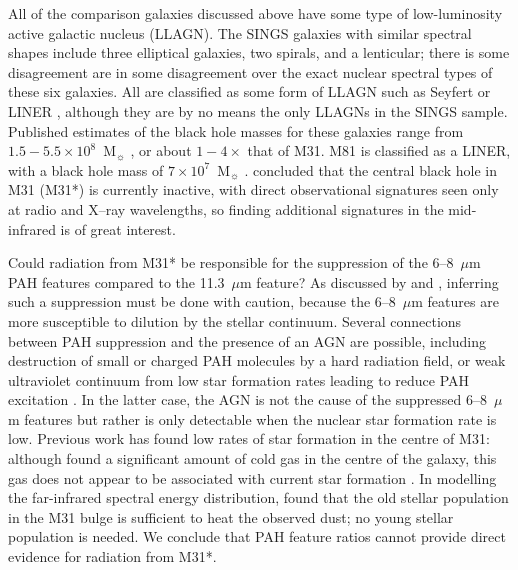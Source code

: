 All of the comparison galaxies discussed above have some type of low-luminosity active galactic nucleus (LLAGN).
The SINGS galaxies with similar spectral shapes include  three elliptical galaxies, two spirals, and a lenticular;
there is some disagreement  \citep{kennicutt03,Smith:2007lr, moustakas2010} are in some disagreement over the
exact nuclear spectral types of these six galaxies.  All are classified as some form of LLAGN
such as Seyfert or LINER \citep[luminous AGNs were intentionally omitted from the SINGS sample;][]{kennicutt03}, although they are
by no means the only LLAGNs in the SINGS sample.
Published estimates of the black hole masses for these galaxies range from $1.5-5.5\times10^{8}$~M$_{\sun}$
\citep[for NGC~1316 and NGC~4595, respectively]{nowak08, kormendy88}, or about $1-4\times$ that of M31.
M81 is classified as a LINER, with a black hole mass of $7\times10^7$~M$_{\sun}$ \citep{devereux03}.
\citet{Li09} concluded that the central black hole in M31 (M31*) is currently inactive, with direct observational signatures seen only
at radio and X--ray wavelengths, so finding additional signatures in the mid-infrared is of great interest.


Could radiation from M31* be responsible for the suppression of the  6--8~$\mu$m PAH features compared
to the 11.3~$\mu$m feature?
As discussed by  \citet{Smith:2007lr} and \citet{Smith2010}, inferring such a suppression must be done with caution, 
because the 6--8~$\mu$m features are more susceptible to dilution by the stellar continuum. 
Several connections between PAH suppression and the presence of an AGN are possible, including destruction of small 
or charged PAH molecules by a hard radiation field, or weak ultraviolet continuum from low star formation rates 
leading to reduce PAH excitation \citep{Smith:2007lr}.  In the latter case, the AGN is not the cause of
the suppressed  6--8~$\mu$m features but rather is only detectable when the nuclear star formation rate is low.
Previous work has found low rates of star formation in the centre of M31: although \citet{Melchior2013} found a significant 
amount of cold gas in the centre of the galaxy, this gas does not appear to be associated with current star formation \citep[see also][]{li09}.
In modelling the far-infrared spectral energy distribution, \cite{Groves2012} found that  
the old stellar population in the M31 bulge is sufficient  to heat the observed dust; no young stellar population is needed.
We conclude that PAH feature ratios cannot provide direct evidence for radiation from M31*.


